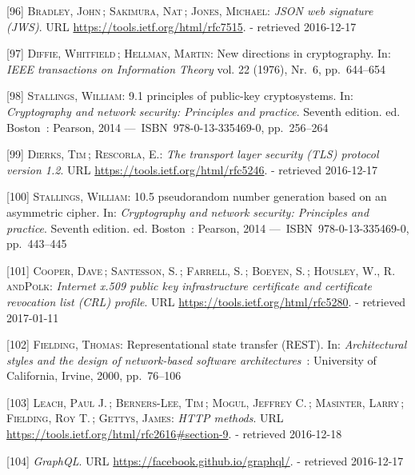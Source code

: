 \documentclass[12pt,english,a4paper,titlepage,cleardoublepage=empty,dottedtoc]{report}
\begin{document}
\hypertarget{ref-web_spec_json-web-signature}{}
{[}96{]} \textsc{Bradley, John}\,; \textsc{Sakimura, Nat}\,;
\textsc{Jones, Michael}: \emph{JSON web signature (JWS)}. URL
\url{https://tools.ietf.org/html/rfc7515}. - retrieved 2016-12-17

\hypertarget{ref-paper_1976_d-h-key-exchange}{}
{[}97{]} \textsc{Diffie, Whitfield}\,; \textsc{Hellman, Martin}: New
directions in cryptography. In: \emph{IEEE transactions on Information
Theory} vol. 22 (1976), Nr.~6, pp.~644--654

\hypertarget{ref-book_2014_chapter-9-1-public-key-crypto}{}
{[}98{]} \textsc{Stallings, William}: 9.1 principles of public-key
cryptosystems. In: \emph{Cryptography and network security: Principles
and practice}. Seventh edition. ed. Boston~: Pearson, 2014
---~ISBN~978-0-13-335469-0, pp.~256--264

\hypertarget{ref-web_spec_tls}{}
{[}99{]} \textsc{Dierks, Tim}\,; \textsc{Rescorla, E.}: \emph{The
transport layer security (TLS) protocol version 1.2}. URL
\url{https://tools.ietf.org/html/rfc5246}. - retrieved 2016-12-17

\hypertarget{ref-book_2014_chapter-14-5-pki}{}
{[}100{]} \textsc{Stallings, William}: 10.5 pseudorandom number
generation based on an asymmetric cipher. In: \emph{Cryptography and
network security: Principles and practice}. Seventh edition. ed.
Boston~: Pearson, 2014 ---~ISBN~978-0-13-335469-0, pp.~443--445

\hypertarget{ref-web_spec_x509}{}
{[}101{]} \textsc{Cooper, Dave}\,; \textsc{Santesson, S.}\,;
\textsc{Farrell, S.}\,; \textsc{Boeyen, S.}\,; \textsc{Housley, W.,
\textnormal{R. andPolk}}: \emph{Internet x.509 public key infrastructure
certificate and certificate revocation list (CRL) profile}. URL
\url{https://tools.ietf.org/html/rfc5280}. - retrieved 2017-01-11

\hypertarget{ref-web_spec_rest}{}
{[}102{]} \textsc{Fielding, Thomas}: Representational state transfer
(REST). In: \emph{Architectural styles and the design of network-based
software architectures}~: University of California, Irvine, 2000,
pp.~76--106

\hypertarget{ref-web_spec_http-methods}{}
{[}103{]} \textsc{Leach, Paul J.}\,; \textsc{Berners-Lee, Tim}\,;
\textsc{Mogul, Jeffrey C.}\,; \textsc{Masinter, Larry}\,;
\textsc{Fielding, Roy T.}\,; \textsc{Gettys, James}: \emph{HTTP
methods}. URL \url{https://tools.ietf.org/html/rfc2616\#section-9}. -
retrieved 2016-12-18

\hypertarget{ref-web_spec_graphql}{}
{[}104{]} \emph{GraphQL}. URL \url{https://facebook.github.io/graphql/}.
- retrieved 2016-12-17
\end{document}
